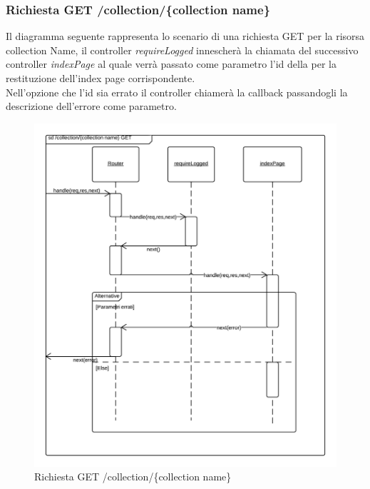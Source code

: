\subsubsection{Richiesta GET /collection/\{collection name\}} 
Il diagramma seguente rappresenta lo scenario di una richiesta GET per la risorsa collection Name, il controller \emph{requireLogged} innescherà la chiamata del successivo controller \emph{indexPage} al quale verrà passato come parametro l'id della  per la restituzione dell'index page corrispondente. \\ 
Nell'opzione che l'id sia errato il controller chiamerà la callback passandogli la descrizione dell'errore come parametro.
\begin{figure}[H]
	\begin{center} 
		\includegraphics[scale=0.20]{scenari/Collection Name GET.png} 
		\caption{Richiesta GET /collection/\{collection name\}}
	\end{center} 
\end{figure}

\pagebreak
